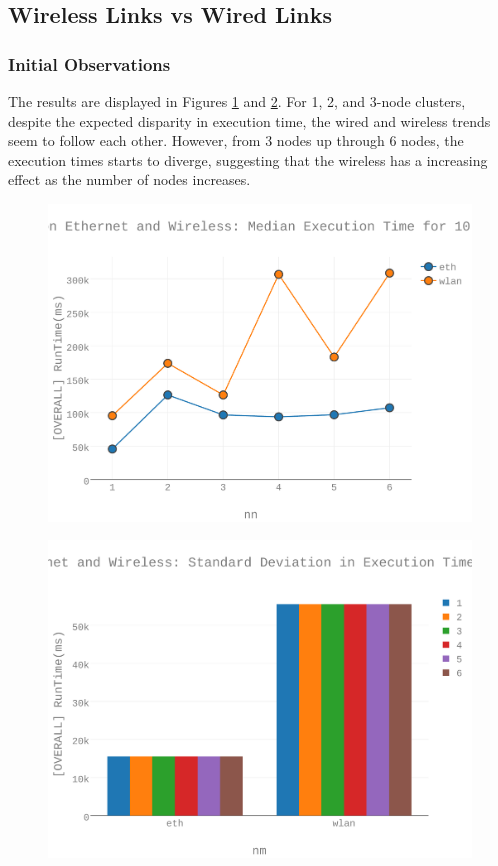 \subsection{Wireless Links vs Wired Links}
\subsubsection{Initial Observations}
The results are displayed in Figures \ref{figures-wla_fig7} and \ref{figures-wla_fig9}.  For 1, 2, and 3-node clusters, despite the expected  disparity in execution time, the wired and wireless trends seem to follow each other.  However, from 3 nodes up through 6 nodes, the execution times starts to diverge, suggesting that the wireless has a increasing effect as the number of nodes increases. \begin{figure}[h]
\includegraphics[width=5.5in]{Figures/figures-wla_fig7.pdf}
\caption{}
\label{figures-wla_fig7}
\end{figure}

\begin{figure}[h]
\includegraphics[width=5.5in]{Figures/figures-wla_fig9.pdf}
\caption{}
\label{figures-wla_fig9}
\end{figure}



